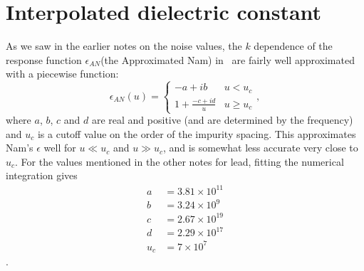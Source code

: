 \documentclass[11pt]{article}
\begin{document}
	\graphicspath{{figures/}}

	\section{Interpolated dielectric constant} \label{sec:bigkinterpolation}

	As we saw in the earlier notes on the noise values, the $k$ dependence of the response function $\epsilon_{AN}$(the Approximated Nam) in~\cite{Nam1967} are fairly well approximated with a piecewise function:
	\begin{equation}
		\epsilon_{AN}(u) =
		\begin{cases}
			-a + i b & u < u_c \\
			1 + \frac{-c + i d}{u} & u \geq u_c
		\end{cases}, \label{eq:epsAN}
	\end{equation}
	where $a$, $b$, $c$ and $d$ are real and positive (and are determined by the frequency) and $u_c$ is a cutoff value on the order of the impurity spacing.
	This approximates Nam's $\epsilon$ well for $u \ll u_c$ and $u \gg u_c$, and is somewhat less accurate very close to $u_c$.
	For the values mentioned in the other notes for lead, fitting the numerical integration gives
	\begin{align}
		a &= 3.81 \times 10^{11} \\
		b &= 3.24 \times 10^{9} \\
		c &= 2.67 \times 10^{19} \\
		d &= 2.29 \times 10^{17} \\
		u_c &= 7 \times 10^{7}
	\end{align}.
\end{document}
